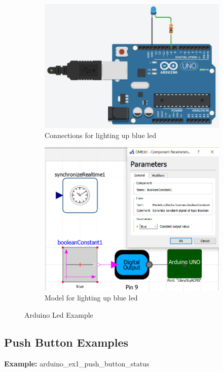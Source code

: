 \documentclass[12pt,a4paper]{report}
\begin{document}
\begin{figure}[H]
\begin{subfigure}{.5\textwidth}
\centering
\includegraphics[width =\linewidth]{1}
\caption{Connections for lighting up blue led}
\end{subfigure}
\begin{subfigure}{.5\textwidth}
\centering
\includegraphics[width =\linewidth]{led_ex1}
\caption{Model for lighting up blue led}
\end{subfigure}
\caption {Arduino Led Example}
\label{figure:14}
\end{figure}

\subsection{Push Button Examples}
\textbf{Example:} arduino\_ex1\_push\_button\_status\\
\end{document}
